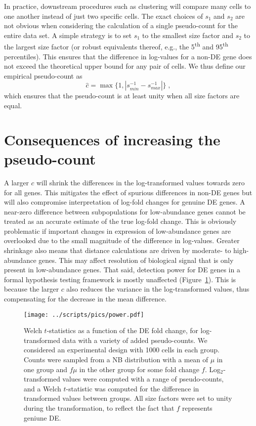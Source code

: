 \documentclass[10pt,letterpaper]{article}
\begin{document}
In practice, downstream procedures such as clustering will compare many cells to one another instead of just two specific cells.
The exact choices of $s_1$ and $s_2$ are not obvious when considering the calculation of a single pseudo-count for the entire data set.
A simple strategy is to set $s_1$ to the smallest size factor and $s_2$ to the largest size factor
(or robust equivalents thereof, e.g., the 5\textsuperscript{th} and 95\textsuperscript{th} percentiles).
This ensures that the difference in log-values for a non-DE gene does not exceed the theoretical upper bound for any pair of cells.
We thus define our empirical pseudo-count as
\[
\hat c = \max\{1, |s_{min}^{-1} - s_{max}^{-1}|\} \;,
\]
which ensures that the pseudo-count is at least unity when all size factors are equal.

\section{Consequences of increasing the pseudo-count}
A larger $c$ will shrink the differences in the log-transformed values towards zero for all genes.
This mitigates the effect of spurious differences in non-DE genes but will also compromise interpretation of log-fold changes for genuine DE genes.
A near-zero difference between subpopulations for low-abundance genes cannot be treated as an accurate estimate of the true log-fold change. 
This is obviously problematic if important changes in expression of low-abundance genes are overlooked due to the small magnitude of the difference in log-values.
Greater shrinkage also means that distance calculations are driven by moderate- to high-abundance genes.
This may affect resolution of biological signal that is only present in low-abundance genes.
That said, detection power for DE genes in a formal hypothesis testing framework is mostly unaffected (Figure~\ref{fig:power}).
This is because the larger $c$ also reduces the variance in the log-transformed values, 
thus compensating for the decrease in the mean difference.

\begin{figure}
\begin{center}
\texttt{[image: ../scripts/pics/power.pdf]}
\end{center}
\caption{Welch $t$-statistics as a function of the DE fold change, for log-transformed data with a variety of added pseudo-counts.
We considered an experimental design with 1000 cells in each group.
Counts were sampled from a NB distribution with a mean of $\mu$ in one group and $f\mu$ in the other group for some fold change $f$.
Log$_2$-transformed values were computed with a range of pseudo-counts, and a Welch $t$-statistic was computed for the difference in transformed values between groups.
All size factors were set to unity during the transformation, to reflect the fact that $f$ represents geniune DE. 
}
\label{fig:power}
\end{figure}




\end{document}
